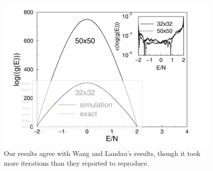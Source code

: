 \documentclass[../notebook.tex]{subfiles}
\begin{document}

\begin{figure}[h]
  \centering
  \includegraphics{ising-compare}
  \caption{Our results agree with Wang and Landau's results, though it took more
  iterations than they reported to reproduce.}\label{fig:ising-compare}
\end{figure}
\end{document}
